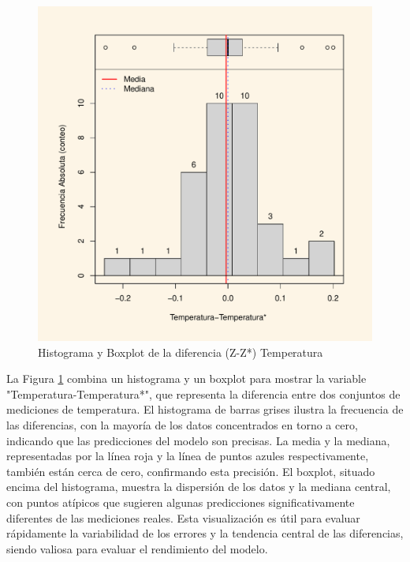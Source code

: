 \begin{figure}[!htb]
    \centering
    \includegraphics[width=0.75\linewidth]{Figuras_AED//VARIOGRAFICO/tem-tem+_HistBoxPlot1.pdf}
    \caption{Histograma y Boxplot de la diferencia (Z-Z*) Temperatura}
    \label{fig:enter-labelzx}
\end{figure}

 La Figura \ref{fig:enter-labelzx} combina un histograma y un boxplot para mostrar la variable "Temperatura-Temperatura*", que representa la diferencia entre dos conjuntos de mediciones de temperatura. El histograma de barras grises ilustra la frecuencia de las diferencias, con la mayoría de los datos concentrados en torno a cero, indicando que las predicciones del modelo son precisas. La media y la mediana, representadas por la línea roja y la línea de puntos azules respectivamente, también están cerca de cero, confirmando esta precisión. El boxplot, situado encima del histograma, muestra la dispersión de los datos y la mediana central, con puntos atípicos que sugieren algunas predicciones significativamente diferentes de las mediciones reales. Esta visualización es útil para evaluar rápidamente la variabilidad de los errores y la tendencia central de las diferencias, siendo valiosa para evaluar el rendimiento del modelo.



